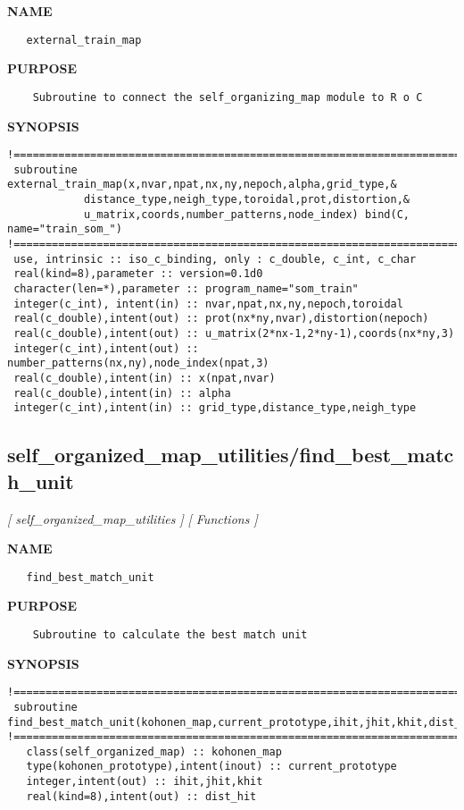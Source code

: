 \documentclass{article}
\begin{document}
\label{ch:robo43}
\label{ch:self_organized_map_utilities_external_train_map}
\textbf{NAME}
\begin{verbatim}
   external_train_map
\end{verbatim}
\textbf{PURPOSE}
\begin{verbatim}
    Subroutine to connect the self_organizing_map module to R o C
\end{verbatim}
\textbf{SYNOPSIS}
\begin{verbatim}
!========================================================================================
 subroutine external_train_map(x,nvar,npat,nx,ny,nepoch,alpha,grid_type,&
            distance_type,neigh_type,toroidal,prot,distortion,&
            u_matrix,coords,number_patterns,node_index) bind(C, name="train_som_")
!========================================================================================
 use, intrinsic :: iso_c_binding, only : c_double, c_int, c_char
 real(kind=8),parameter :: version=0.1d0
 character(len=*),parameter :: program_name="som_train"
 integer(c_int), intent(in) :: nvar,npat,nx,ny,nepoch,toroidal
 real(c_double),intent(out) :: prot(nx*ny,nvar),distortion(nepoch)
 real(c_double),intent(out) :: u_matrix(2*nx-1,2*ny-1),coords(nx*ny,3)
 integer(c_int),intent(out) :: number_patterns(nx,ny),node_index(npat,3)
 real(c_double),intent(in) :: x(npat,nvar)
 real(c_double),intent(in) :: alpha
 integer(c_int),intent(in) :: grid_type,distance_type,neigh_type
\end{verbatim}
\newpage
\subsection{self\_organized\_map\_utilities/find\_best\_match\_unit}
\textsl{[ self\_organized\_map\_utilities ]}
\textsl{[ Functions ]}

\label{ch:robo44}
\label{ch:self_organized_map_utilities_find_best_match_unit}
\textbf{NAME}
\begin{verbatim}
   find_best_match_unit
\end{verbatim}
\textbf{PURPOSE}
\begin{verbatim}
    Subroutine to calculate the best match unit  
\end{verbatim}
\textbf{SYNOPSIS}
\begin{verbatim}
!========================================================================================
 subroutine find_best_match_unit(kohonen_map,current_prototype,ihit,jhit,khit,dist_hit)
!========================================================================================
   class(self_organized_map) :: kohonen_map
   type(kohonen_prototype),intent(inout) :: current_prototype
   integer,intent(out) :: ihit,jhit,khit
   real(kind=8),intent(out) :: dist_hit
\end{verbatim}
\newpage
\end{document}
